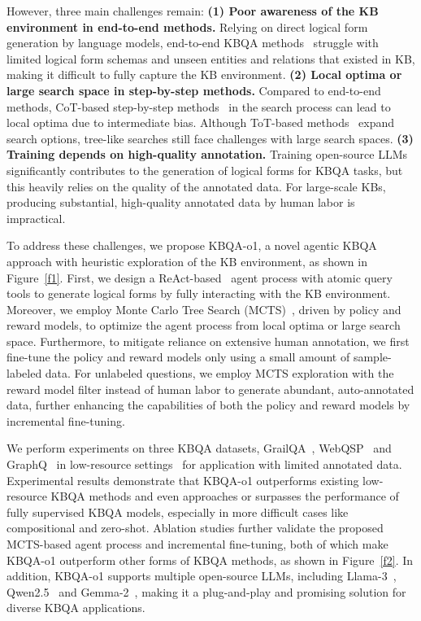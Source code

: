 \documentclass{article}
\theoremstyle{plain}
\theoremstyle{definition}
\theoremstyle{remark}
\begin{document}
However, three main challenges remain:
%
\textbf{(1) Poor awareness of the KB environment in end-to-end methods.}
Relying on direct logical form generation by language models, end-to-end KBQA methods~\cite{KB-BINDER,KB-Coder} struggle with limited logical form schemas and unseen entities and relations that existed in KB, making it difficult to fully capture the KB environment.
%
\textbf{(2) Local optima or large search space in step-by-step methods.}
Compared to end-to-end methods, CoT-based step-by-step methods~\cite{QueryAgent} in the search process can lead to local optima due to intermediate bias.
Although ToT-based methods~\cite{ToG} expand search options, tree-like searches still face challenges with large search spaces.
%
\textbf{(3) Training depends on high-quality annotation.} 
Training open-source LLMs~\cite{ChatKBQA} significantly contributes to the generation of logical forms for KBQA tasks, but this heavily relies on the quality of the annotated data.
For large-scale KBs, producing substantial, high-quality annotated data by human labor is impractical.

To address these challenges, we propose KBQA-o1, a novel agentic KBQA approach with heuristic exploration of the KB environment, as shown in Figure~\ref{f1}. 
First, we design a ReAct-based~\cite{ReAct} agent process with atomic query tools to generate logical forms by fully interacting with the KB environment.
Moreover, we employ Monte Carlo Tree Search (MCTS)~\cite{MCTS}, driven by policy and reward models, to optimize the agent process from local optima or large search space. 
Furthermore, to mitigate reliance on extensive human annotation, we first fine-tune the policy and reward models only using a small amount of sample-labeled data. For unlabeled questions, we employ MCTS exploration with the reward model filter instead of human labor to generate abundant, auto-annotated data, further enhancing the capabilities of both the policy and reward models by incremental fine-tuning.

We perform experiments on three KBQA datasets, GrailQA~\cite{GrailQA}, WebQSP~\cite{WebQSP} and GraphQ~\cite{GraphQ} in low-resource settings~\cite{KB-BINDER} for application with limited annotated data.
Experimental results demonstrate that KBQA-o1 outperforms existing low-resource KBQA methods and even approaches or surpasses the performance of fully supervised KBQA models, especially in more difficult cases like compositional and zero-shot. 
Ablation studies further validate the proposed MCTS-based agent process and incremental fine-tuning, both of which make KBQA-o1 outperform other forms of KBQA methods, as shown in Figure~\ref{f2}. 
In addition, KBQA-o1 supports multiple open-source LLMs, including Llama-3~\cite{llama3}, Qwen2.5~\cite{Qwen2.5} and Gemma-2~\cite{Gemma2}, making it a plug-and-play and promising solution for diverse KBQA applications.
\end{document}

